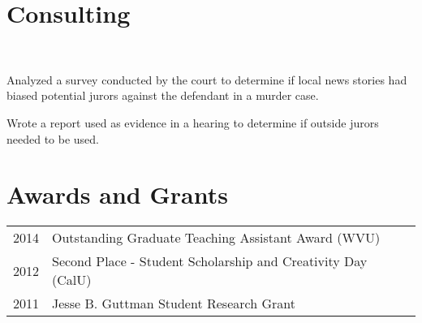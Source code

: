 \documentclass[letterpaper]{deedy-resume} %
\begin{document}
\begin{minipage}[t]{0.63\textwidth}
\sectionspace %
\vspace{-6pt}
\section{Consulting}
\\
\begin{tightitemize}
\item Analyzed a survey conducted by the court to determine if
  local news stories had biased potential jurors against the defendant in a
  murder case.
\item Wrote a report used as evidence in a hearing to determine if
  outside jurors needed to be used.
\end{tightitemize}

\sectionspace %


\vspace{-7pt}
\section{Awards and Grants} 

\begin{tabular}{rl}
2014 & Outstanding Graduate Teaching Assistant Award (WVU)\\
2012 & Second Place - Student Scholarship and Creativity Day (CalU)\\
2011 & Jesse B. Guttman Student Research Grant\\
\end{tabular}

\sectionspace %




\end{minipage} %
\end{document}
